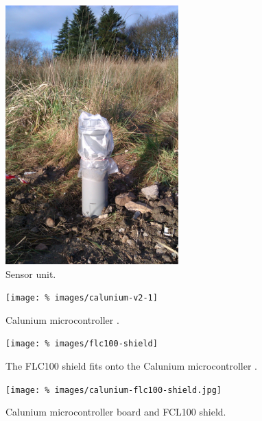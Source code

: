 \begin{figure}[!h]
  \centering
  \includegraphics[keepaspectratio,height=10cm]{images/sensor-unit}
  \caption[Sensor unit]{%
    Sensor unit.  
  }
  \label{fig:sensor-unit}
\end{figure}

\begin{figure}
  \centering
  \texttt{[image: \%
    images/calunium-v2-1]}
  \caption[Calunium microcontroller PCB]{%
    Calunium microcontroller \pcb. %
    }
  \label{fig:calunium}
\end{figure}

\begin{figure}
  \centering
  \texttt{[image: \%
    images/flc100-shield]}
  \caption[FLC100 shield]{The FLC100 shield fits onto the Calunium
    microcontroller \pcb. }
  \label{fig:flc-100-shield}
\end{figure}

\begin{figure}
  \centering
  \texttt{[image: \%
    images/calunium-flc100-shield.jpg]}
  \caption[Calunium microcontroller board and FCL100 shield]{%
    Calunium microcontroller board and FCL100 shield. 
    }
  \label{fig:calunium-flc-100-shield}
\end{figure}

